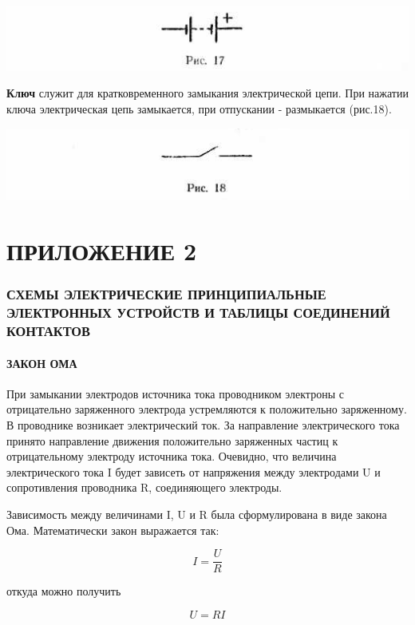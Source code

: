 \documentclass[12pt]{article}
\begin{document}
\includegraphics[width=\textwidth]{ekon3_014_2}

\textbf{Ключ} служит для кратковременного замыкания электрической цепи. При нажатии ключа электрическая цепь замыкается, при отпускании - размыкается (рис.18).

\includegraphics[scale=0.9]{ekon3_014_3}

\newpage

\part{ПРИЛОЖЕНИЕ 2}
\section{СХЕМЫ ЭЛЕКТРИЧЕСКИЕ ПРИНЦИПИАЛЬНЫЕ ЭЛЕКТРОННЫХ УСТРОЙСТВ И ТАБЛИЦЫ СОЕДИНЕНИЙ КОНТАКТОВ}

\subsection{ЗАКОН ОМА}

При замыкании электродов источника тока проводником электроны с отрицательно заряженного электрода устремляются к положительно заряженному. В проводнике возникает электрический ток. За направление электрического тока принято направление движения положительно заряженных частиц к отрицательному электроду источника тока. Очевидно, что величина электрического тока I будет зависеть от напряжения между электродами U и сопротивления проводника R, соединяющего электроды.

Зависимость между величинами I, U и R была сформулирована в виде закона Ома. Математически закон выражается так:

\begin{equation}
I = \frac{U}{R}
\label{Ohm_law1}
\end{equation} 

откуда можно получить

\begin{equation}
U = R I
\label{Ohm_law2}
\end{equation} 
\end{document}
